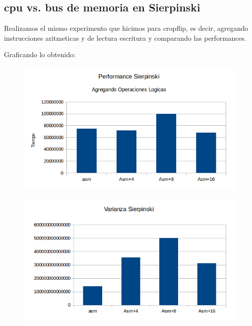 \documentclass[a4paper]{article}
\begin{document}
\newpage
\subsection{cpu vs. bus de memoria en Sierpinski}

Realizamos el mismo experimento que hicimos para cropflip, es decir, agregando instrucciones aritmeticas y de lectura escritura y comparando las performances.

Graficando lo obtenido:

\begin{figure}[h!]
  \begin{center}
  \includegraphics[scale=0.66]{Graficos1.5/sie/addsub/per.png}
  \label{nombreparareferenciar1}
  \end{center}
\end{figure}

\begin{figure}[h!]
  \begin{center}
  \includegraphics[scale=0.66]{Graficos1.5/sie/addsub/var.png}
  \label{nombreparareferenciar1}
  \end{center}
\end{figure}
\end{document}
